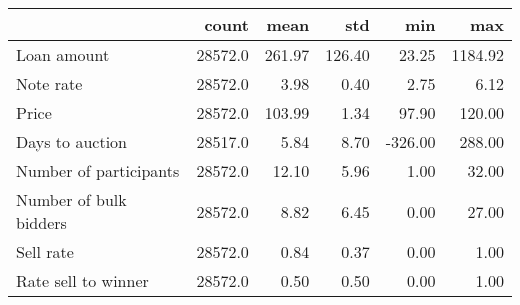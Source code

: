 \begin{tabular}{lrrrrr}
\toprule
{} &    count &    mean &     std &     min &      max \\
\midrule
Loan amount            &  28572.0 &  261.97 &  126.40 &   23.25 &  1184.92 \\
Note rate              &  28572.0 &    3.98 &    0.40 &    2.75 &     6.12 \\
Price                  &  28572.0 &  103.99 &    1.34 &   97.90 &   120.00 \\
Days to auction        &  28517.0 &    5.84 &    8.70 & -326.00 &   288.00 \\
Number of participants &  28572.0 &   12.10 &    5.96 &    1.00 &    32.00 \\
Number of bulk bidders &  28572.0 &    8.82 &    6.45 &    0.00 &    27.00 \\
Sell rate              &  28572.0 &    0.84 &    0.37 &    0.00 &     1.00 \\
Rate sell to winner    &  28572.0 &    0.50 &    0.50 &    0.00 &     1.00 \\
\bottomrule
\end{tabular}
